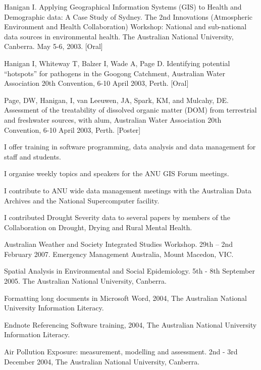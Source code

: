 \documentclass[a4paper,11pt]{article}
\begin{document}
\ind Hanigan I. Applying Geographical Information Systems (GIS) to Health and Demographic data: A Case Study of Sydney. The 2nd Innovations (Atmospheric Environment and Health Collaboration) Workshop: National and sub-national data sources in environmental health. The Australian National University, Canberra. May 5-6, 2003. [Oral]

\ind Hanigan I, Whiteway T, Balzer I, Wade A, Page D. Identifying potential “hotspots” for pathogens in the Googong Catchment, Australian Water Association 20th Convention, 6-10 April 2003, Perth. [Oral]

\ind Page, DW, Hanigan, I, van Leeuwen, JA, Spark, KM, and Mulcahy, DE.  Assessment of the treatability of dissolved organic matter (DOM) from terrestrial and freshwater sources, with alum, Australian Water Association 20th Convention, 6-10 April 2003, Perth. [Poster]



\bigskip


\medskip
\noindent I offer training in software programming, data analysis and data management for staff and students.

\noindent I organise weekly topics and speakers for the ANU GIS Forum meetings.

\noindent I contribute to ANU wide data management meetings with the Australian Data Archives and the National Supercomputer facility.

\noindent I contributed Drought Severity data to several papers by members of the Collaboration on Drought, Drying and Rural Mental Health.

\medskip

\ind Australian Weather and Society Integrated Studies Workshop.  29th – 2nd February 2007.  Emergency Management Australia, Mount Macedon, VIC.

\ind Spatial Analysis in Environmental and Social Epidemiology.  5th  - 8th  September 2005. The Australian National University, Canberra.

\ind Formatting long documents in Microsoft Word, 2004, The Australian National University Information Literacy.

\ind Endnote Referencing Software training, 2004, The Australian National University Information Literacy.

\ind Air Pollution Exposure: measurement, modelling and assessment.  2nd - 3rd  December 2004, The Australian National University, Canberra. 
\end{document}
